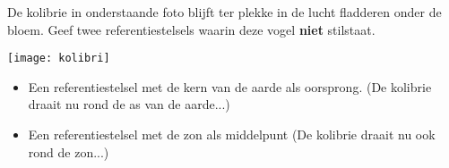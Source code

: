 \documentclass{ximera}
\begin{document}
\begin{exercise}
De kolibrie in onderstaande foto blijft ter plekke in de lucht fladderen onder de bloem. Geef twee referentiestelsels waarin deze vogel \textbf{niet} stilstaat. 

\begin{center}
\begin{minipage}[t]{0.30\textwidth}
\begin{image}[\linewidth]
	\texttt{[image: kolibri]}
\end{image}
\end{minipage}
\end{center}


\begin{oplossing}\nl
\begin{itemize}
\item Een referentiestelsel met de kern van de aarde als oorsprong. (De kolibrie draait nu rond de as van de aarde...)
\item Een referentiestelsel met de zon als middelpunt (De kolibrie draait nu ook rond de zon...)
\end{itemize}

\end{oplossing}

\end{exercise}
\end{document}
